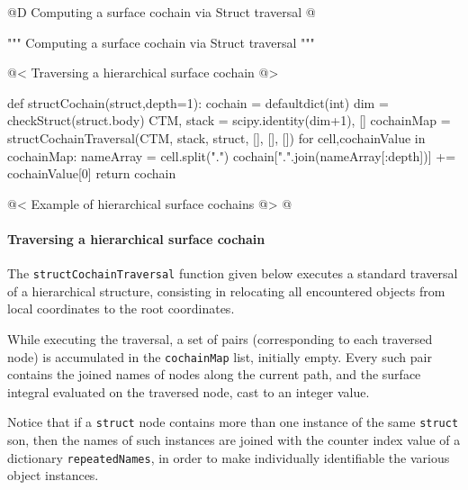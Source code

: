 \documentclass[11pt,oneside]{article}    %
\begin{document}
@D Computing a surface cochain via Struct traversal
@{""" Computing a surface cochain via Struct traversal """

@< Traversing a hierarchical surface cochain @>

def structCochain(struct,depth=1):
    cochain = defaultdict(int)
    dim = checkStruct(struct.body)
    CTM, stack = scipy.identity(dim+1), []
    cochainMap = structCochainTraversal(CTM, stack, struct, [], [], []) 
    for cell,cochainValue in cochainMap:
        nameArray = cell.split(".")
        cochain[".".join(nameArray[:depth])] += cochainValue[0]
    return cochain
    
@< Example of hierarchical surface cochains @>
@}

\paragraph{Traversing a hierarchical surface cochain}
The \texttt{structCochainTraversal} function given below executes a standard traversal of a hierarchical structure, consisting in relocating all encountered objects from local coordinates to the root coordinates. 

While executing the traversal, a set of pairs (corresponding to each traversed node) is accumulated in the \texttt{cochainMap} list, initially empty. Every such pair contains the joined names of nodes along the current path, and the surface integral evaluated on the traversed node, cast to an integer value. 

Notice that if a \texttt{struct} node contains more than one instance of the same \texttt{struct} son, then the names of such instances are joined with the counter index value of a dictionary \texttt{repeatedNames}, in order to make individually identifiable the various object instances.
\end{document}
